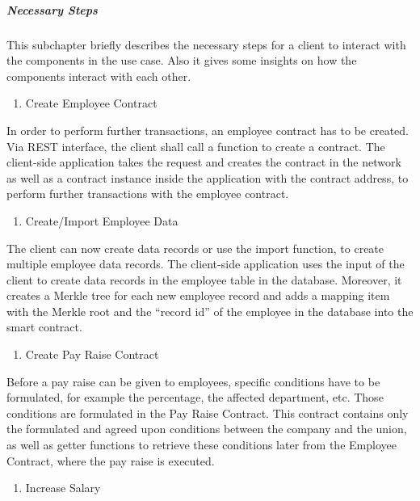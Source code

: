 \subparagraph{Necessary Steps}

This subchapter briefly describes the necessary steps for a client to interact with the components in the use case. Also it gives some insights on how the components interact with each other.

\begin{enumerate}
	\item Create Employee Contract
\end{enumerate}

In order to perform further transactions, an employee contract has to be created. Via REST interface, the client shall call a function to create a contract. The client-side application takes the request and creates the contract in the network as well as a contract instance inside the application with the contract address, to perform further transactions with the employee contract.

\begin{enumerate}[resume]
	\item Create/Import Employee Data
\end{enumerate}

The client can now create data records or use the import function, to create multiple employee data records. The client-side application uses the input of the client to create data records in the employee table in the database. Moreover, it creates a Merkle tree for each new employee record and adds a mapping item with the Merkle root and the “record id” of the employee in the database into the smart contract. 

\begin{enumerate}[resume]
	\item Create Pay Raise Contract
\end{enumerate}

Before a pay raise can be given to employees, specific conditions have to be formulated, for example the percentage, the affected department, etc. Those conditions are formulated in the Pay Raise Contract. This contract contains only the formulated and agreed upon conditions between the company and the union, as well as getter functions to retrieve these conditions later from the Employee Contract, where the pay raise is executed.

\begin{enumerate}[resume]
	\item Increase Salary
\end{enumerate}

